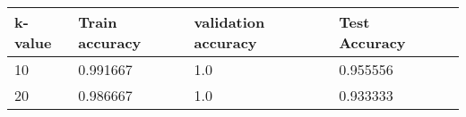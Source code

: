 \def\arraystretch{1.25}
\begin{center}
\begin{longtable}{l l l l l}
\hline
\hline
\textbf{k-value} & \textbf{Train accuracy} & \textbf{validation accuracy} & \textbf{Test Accuracy}\\
\hline
\hline
10 & 0.991667 & 1.0 & 0.955556 \\
20 & 0.986667 & 1.0 & 0.933333 \\
\hline
\end{longtable}
\setcounter{table}{3}
\end{center}